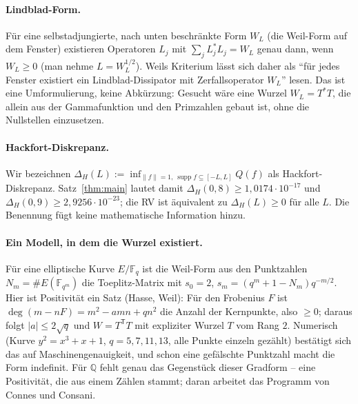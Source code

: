 \documentclass[11pt,a4paper]{article}
\theoremstyle{definition}
\begin{document}
\paragraph{Lindblad-Form.} Für eine selbstadjungierte, nach unten beschränkte Form $W_L$ (die Weil-Form auf dem Fenster) existieren Operatoren $L_j$ mit $\sum_jL_j^*L_j=W_L$ genau dann, wenn $W_L\ge0$ (man nehme $L=W_L^{1/2}$). Weils Kriterium lässt sich daher als ``für jedes Fenster existiert ein Lindblad-Dissipator mit Zerfallsoperator $W_L$'' lesen. Das ist eine Umformulierung, keine Abkürzung: Gesucht wäre eine Wurzel $W_L=T^*T$, die allein aus der Gammafunktion und den Primzahlen gebaut ist, ohne die Nullstellen einzusetzen.

\paragraph{Hackfort-Diskrepanz.} Wir bezeichnen $\Delta_H(L):=\inf_{\|f\|=1,\ \operatorname{supp}f\subseteq[-L,L]}Q(f)$ als Hackfort-Diskrepanz. Satz~\ref{thm:main} lautet damit $\Delta_H(0{,}8)\ge1{,}0174\cdot10^{-17}$ und $\Delta_H(0{,}9)\ge2{,}9256\cdot10^{-23}$; die RV ist äquivalent zu $\Delta_H(L)\ge0$ für alle $L$. Die Benennung fügt keine mathematische Information hinzu.

\paragraph{Ein Modell, in dem die Wurzel existiert.} Für eine elliptische Kurve $E/\mathbb F_q$ ist die Weil-Form aus den Punktzahlen $N_m=\#E(\mathbb F_{q^m})$ die Toeplitz-Matrix mit $s_0=2$, $s_m=(q^m+1-N_m)q^{-m/2}$. Hier ist Positivität ein Satz (Hasse, Weil): Für den Frobenius $F$ ist $\deg(m-nF)=m^2-amn+qn^2$ die Anzahl der Kernpunkte, also $\ge0$; daraus folgt $|a|\le2\sqrt q$ und $W=T^{\mathsf T}T$ mit expliziter Wurzel $T$ vom Rang $2$. Numerisch (Kurve $y^2=x^3+x+1$, $q=5,7,11,13$, alle Punkte einzeln gezählt) bestätigt sich das auf Maschinengenauigkeit, und schon eine gefälschte Punktzahl macht die Form indefinit. Für $\mathbb Q$ fehlt genau das Gegenstück dieser Gradform -- eine Positivität, die aus einem Zählen stammt; daran arbeitet das Programm von Connes und Consani.
\end{document}
